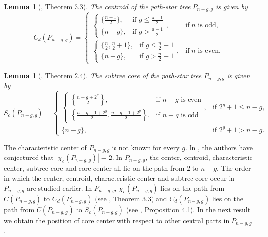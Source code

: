 \documentclass[11pt]{article}
\newtheorem{lemma}[theorem]{Lemma}
\begin{document}
\begin{lemma}[\cite{Des}, Theorem 3.3]\label{lem2.3}
The centroid of the path-star tree $P_{n - g, g}$ is given by
\begin{equation*}
C_d(P_{n - g, g}) =
\begin{cases}
\begin{cases}
\{\frac{n + 1}{2}\}, &\text{if $g \leq \frac{n - 1}{2}$}\\
\{n - g\}, &\text{if $g > \frac{n - 1}{2}$}
\end{cases}, &\text{if $n$ is odd,}\\
\begin{cases}
\{\frac{n}{2}, \frac{n}{2} + 1\}, &\text{if $g \leq \frac{n}{2} - 1$}\\
\{n - g\}, &\text{if $g > \frac{n}{2} - 1$}
\end{cases}, &\text{if $n$ is even.}
\end{cases}
\end{equation*}
\end{lemma}

\begin{lemma}[\cite{Des}, Theorem 2.4]\label{lem2.4}
The subtree core of the path-star tree $P_{n-g, g}$ is given by
\begin{equation*}
S_c(P_{n-g, g}) =
\begin{cases}
\begin{cases}
\left\{\frac{n - g + 2^g}{2}\right\}, &\text{if $n - g$ is even}\\
\left\{\frac{n - g - 1 + 2^g}{2}, \frac{n - g + 1 + 2^g}{2}\right\} , &\text{if $n - g$ is odd}
\end{cases}, &\text{if $2^g + 1 \leq n - g$,}\\
\{n - g\}, &\text{if $2^g + 1 > n - g.$}
\end{cases}
\end{equation*}
\end{lemma}

The  characteristic center of $P_{n-g,g}$ is not known for every $g$. In \cite{Pandey2}, the authors have conjectured that 
$|\chi_c(P_{n-g,g})|=2$. In $P_{n-g,g}$, the center, centroid, characteristic center, subtree core and core center  all lie on the path from $2$ to $n-g$. The order in which the center, centroid, characteristic center and  subtree core occur in $P_{n-g,g}$ are studied earlier. In $P_{n-g,g}$, $\chi_c(P_{n-g,g})$ lies on the path from $C(P_{n-g,g})$ to $C_d(P_{n-g,g})$ (see \cite{Klp}, Theorem 3.3) and $C_d(P_{n-g,g})$ lies on the path from $C(P_{n-g,g})$ to $S_c(P_{n-g,g})$ (see \cite{Des}, Proposition 4.1). In the next result we obtain the  position of core center with respect to other central parts in $P_{n-g,g}$.
\end{document}

